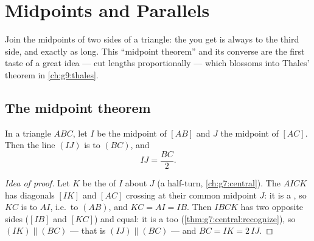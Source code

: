 \chapter{Midpoints and Parallels}\label{ch:g8:midpoints}

Join the midpoints of two sides of a triangle: the  you get is
always  to the third side, and exactly  as long. This
``midpoint theorem'' and its converse are the first taste of a great
idea ---  cut lengths proportionally --- which blossoms into
Thales' theorem in \cref{ch:g9:thales}.

\section{The midpoint theorem}

\begin{theorem}\label{thm:g8:midpoints:direct}
In a triangle $ABC$, let $I$ be the midpoint of $[AB]$ and $J$ the
midpoint of $[AC]$. Then the line $(IJ)$ is  to $(BC)$, and
\[
IJ = \frac{BC}{2} .
\]
\end{theorem}

\begin{proof}[Idea of proof]
Let $K$ be the  of $I$ about $J$ (a half-turn,
\cref{ch:g7:central}). The  $AICK$ has diagonals $[IK]$
and $[AC]$ crossing at their common midpoint $J$: it is a
, so $KC$ is  to $AI$, i.e.\ to $(AB)$, and
$KC = AI = IB$. Then $IBCK$ has two opposite sides ($[IB]$ and
$[KC]$)  and equal: it is a  too
(\cref{thm:g7:central:recognize}), so $(IK) \parallel (BC)$ ---
that is $(IJ) \parallel (BC)$ --- and $BC = IK = 2\,IJ$.
\end{proof}

